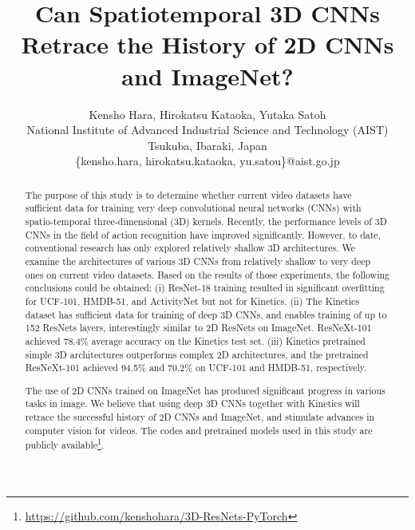 \documentclass[10pt,twocolumn,letterpaper]{article}
\begin{document}
\title{Can Spatiotemporal 3D CNNs Retrace the History of 2D CNNs and ImageNet?}

\author{Kensho Hara, Hirokatsu Kataoka, Yutaka Satoh\\
National Institute of Advanced Industrial Science and Technology (AIST)\\
Tsukuba, Ibaraki, Japan\\
{\ttfamily\small \{kensho.hara, hirokatsu.kataoka, yu.satou\}@aist.go.jp}
}

\maketitle


\begin{abstract}
  The purpose of this study is to determine whether current video datasets have sufficient data for
  training very deep convolutional neural networks (CNNs) with spatio-temporal three-dimensional (3D) kernels.
  Recently, the performance levels of 3D CNNs in the field of action recognition have improved significantly.
  However, to date, conventional research has only explored relatively shallow 3D architectures.
  We examine the architectures of various 3D CNNs from relatively shallow to very deep ones on current video datasets.
  Based on the results of those experiments, the following conclusions could be obtained:
  (i) ResNet-18 training resulted in significant overfitting for UCF-101, HMDB-51, and ActivityNet but not for Kinetics.
  (ii) The Kinetics dataset has sufficient data for training of deep 3D CNNs,
  and enables training of up to 152 ResNets layers, interestingly similar to 2D ResNets on ImageNet.
  ResNeXt-101 achieved 78.4\% average accuracy on the Kinetics test set.
  (iii) Kinetics pretrained simple 3D architectures outperforms complex 2D architectures,
  and the pretrained ResNeXt-101 achieved 94.5\% and 70.2\% on UCF-101 and HMDB-51, respectively.
  
  The use of 2D CNNs trained on ImageNet has produced significant progress in various tasks in image.
  We believe that using deep 3D CNNs together with Kinetics will retrace the successful history of 2D CNNs and ImageNet,
  and stimulate advances in computer vision for videos.
  The codes and pretrained models used in this study are publicly available\footnote{\url{https://github.com/kenshohara/3D-ResNets-PyTorch}}.
\end{abstract}
\end{document}

